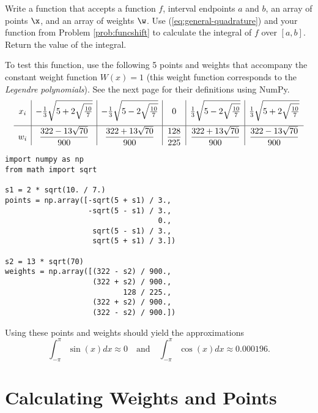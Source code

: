 \begin{problem} %
Write a function that accepts a function $f$, interval endpoints $a$ and $b$, an array of points $\x$, and an array of weights $\w$.
Use (\ref{eq:general-quadrature}) and your function from Problem \ref{prob:funcshift} to calculate the integral of $f$ over $[a,b]$.
Return the value of the integral.

To test this function, use the following 5 points and weights that accompany the constant weight function $W(x) = 1$ (this weight function corresponds to the \emph{Legendre polynomials}). %
See the next page for their definitions using NumPy.
\[
\centering %
\begin{array}{c|c|c|c|c|c}
    x_i
    & -\frac{1}{3}\sqrt{5 + 2\sqrt{\frac{10}{7}}}
    & -\frac{1}{3}\sqrt{5 - 2\sqrt{\frac{10}{7}}}
    & 0
    & \frac{1}{3}\sqrt{5 - 2\sqrt{\frac{10}{7}}}
    & \frac{1}{3}\sqrt{5 + 2\sqrt{\frac{10}{7}}}
    \\[1em] \hline
    w_i
    & \dfrac{322-13\sqrt{70}}{900}
    & \dfrac{322+13\sqrt{70}}{900}
    & \dfrac{128}{225}
    & \dfrac{322+13\sqrt{70}}{900}
    & \dfrac{322-13\sqrt{70}}{900}
\end{array}
\]

\begin{lstlisting}
import numpy as np
from math import sqrt

s1 = 2 * sqrt(10. / 7.)
points = np.array([-sqrt(5 + s1) / 3.,
                   -sqrt(5 - s1) / 3.,
                                   0.,
                    sqrt(5 - s1) / 3.,
                    sqrt(5 + s1) / 3.])

s2 = 13 * sqrt(70)
weights = np.array([(322 - s2) / 900.,
                    (322 + s2) / 900.,
                           128 / 225.,
                    (322 + s2) / 900.,
                    (322 - s2) / 900.])
\end{lstlisting}
Using these points and weights should yield the approximations \[\int_{-\pi}^\pi \sin(x)dx \approx 0\quad\text{and}\quad\int_{-\pi}^\pi \cos(x)dx \approx 0.000196.\]
\end{problem}

\section*{Calculating Weights and Points} %

